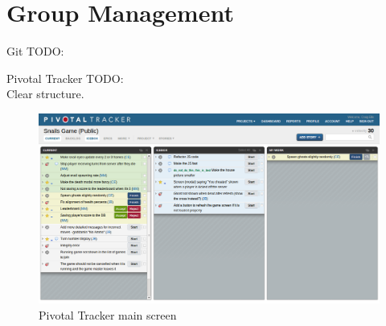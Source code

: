 \documentclass{beamer}
\begin{document}
\section{Group Management}

\begin{frame}{Git}
  TODO:
\end{frame}

\begin{frame}{Pivotal Tracker}
  TODO:\\
  Clear structure.\\
  \begin{figure}[hb]
    \centering
    \includegraphics[scale=0.2]{pivotal.png}
    \caption{Pivotal Tracker main screen}
  \end{figure}
\end{frame}
\end{document}

